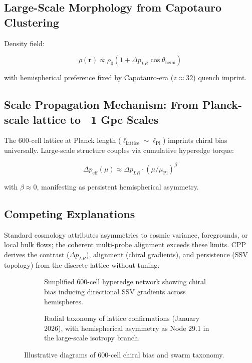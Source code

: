 \documentclass[11pt]{article}
\begin{document}
\subsection{Large-Scale Morphology from Capotauro Clustering}
Density field:

\[
\rho(\mathbf{r}) \propto \rho_0 \left(1 + \Delta p_{LR} \cos\theta_{\text{hemi}}\right)
\]

with hemispherical preference fixed by Capotauro-era ($z \approx 32$) quench imprint.

\subsection{Scale Propagation Mechanism: From Planck-scale lattice to ~1 Gpc Scales}
The 600-cell lattice at Planck length ($\ell_{\text{lattice}} \sim \ell_{\text{Pl}}$) imprints chiral bias universally. Large-scale structure couples via cumulative hyperedge torque:

\[
\Delta p_{\text{eff}}(\mu) \approx \Delta p_{LR} \cdot (\mu / \mu_{\text{Pl}})^\beta
\]

with $\beta \approx 0$, manifesting as persistent hemispherical asymmetry.

\subsection{Competing Explanations}
Standard cosmology attributes asymmetries to cosmic variance, foregrounds, or local bulk flows; the coherent multi-probe alignment exceeds these limits. CPP derives the contrast ($\Delta p_{LR}$), alignment (chiral gradients), and persistence (SSV topology) from the discrete lattice without tuning.

\begin{figure}[htbp]
\centering
\begin{subfigure}{0.45\textwidth}
\centering
\caption{Simplified 600-cell hyperedge network showing chiral bias inducing directional SSV gradients across hemispheres.}
\label{fig:lattice-hemi}
\end{subfigure}
\hfill
\begin{subfigure}{0.45\textwidth}
\centering
\caption{Radial taxonomy of lattice confirmations (January 2026), with hemispherical asymmetry as Node 29.1 in the large-scale isotropy branch.}
\label{fig:taxonomy}
\end{subfigure}
\caption{Illustrative diagrams of 600-cell chiral bias and swarm taxonomy.}
\end{figure}
\end{document}
